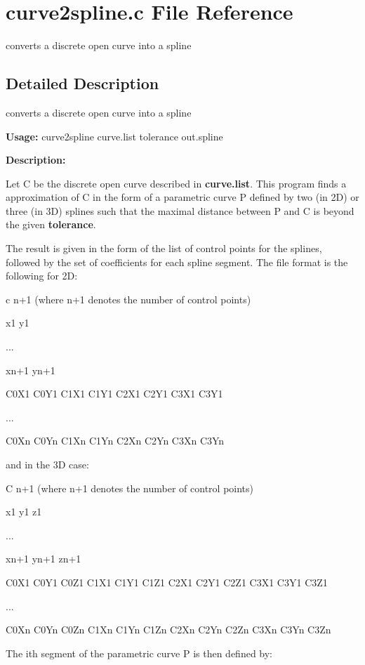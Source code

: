 \section{curve2spline.c File Reference}
\label{curve2spline_8c}
converts a discrete open curve into a spline  




\label{_details}
\subsection{Detailed Description}
converts a discrete open curve into a spline 

{\bf Usage:} curve2spline curve.list tolerance out.spline

{\bf Description:}

Let C be the discrete open curve described in {\bf curve.list}. This program finds a approximation of C in the form of a parametric curve P defined by two (in 2D) or three (in 3D) splines such that the maximal distance between P and C is beyond the given {\bf tolerance}.

The result is given in the form of the list of control points for the splines, followed by the set of coefficients for each spline segment. The file format is the following for 2D:

c n+1 (where n+1 denotes the number of control points)\par
 x1 y1\par
 ...\par
 xn+1 yn+1\par
 C0X1 C0Y1 C1X1 C1Y1 C2X1 C2Y1 C3X1 C3Y1\par
 ...\par
 C0Xn C0Yn C1Xn C1Yn C2Xn C2Yn C3Xn C3Yn\par


and in the 3D case:

C n+1 (where n+1 denotes the number of control points)\par
 x1 y1 z1\par
 ...\par
 xn+1 yn+1 zn+1\par
 C0X1 C0Y1 C0Z1 C1X1 C1Y1 C1Z1 C2X1 C2Y1 C2Z1 C3X1 C3Y1 C3Z1\par
 ...\par
 C0Xn C0Yn C0Zn C1Xn C1Yn C1Zn C2Xn C2Yn C2Zn C3Xn C3Yn C3Zn\par


The ith segment of the parametric curve P is then defined by:

